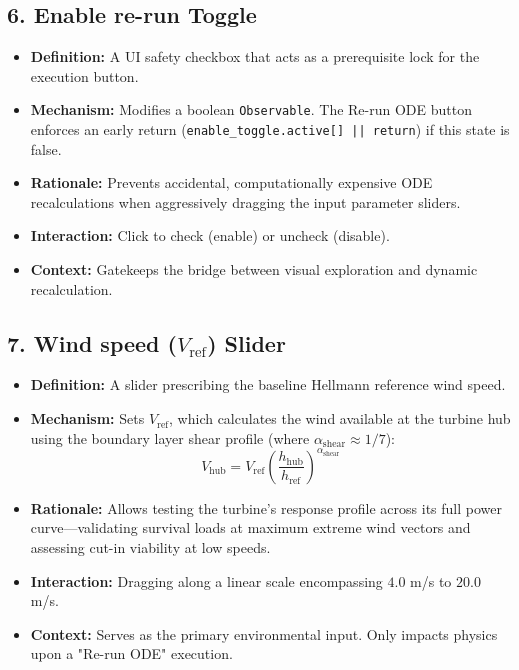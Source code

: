\documentclass[11pt,a4paper]{article}
\begin{document}
\subsection{6. Enable re-run Toggle}
\begin{itemize}
    \item \textbf{Definition:} A UI safety checkbox that acts as a prerequisite lock for the execution button.
    \item \textbf{Mechanism:} Modifies a boolean \texttt{Observable}. The Re-run ODE button enforces an early return (\texttt{enable\_toggle.active[] || return}) if this state is false.
    \item \textbf{Rationale:} Prevents accidental, computationally expensive ODE recalculations when aggressively dragging the input parameter sliders.
    \item \textbf{Interaction:} Click to check (enable) or uncheck (disable).
    \item \textbf{Context:} Gatekeeps the bridge between visual exploration and dynamic recalculation.
\end{itemize}

\subsection{7. Wind speed ($V_{\text{ref}}$) Slider}
\begin{itemize}
    \item \textbf{Definition:} A slider prescribing the baseline Hellmann reference wind speed.
    \item \textbf{Mechanism:} Sets $V_{\text{ref}}$, which calculates the wind available at the turbine hub using the boundary layer shear profile (where $\alpha_{\text{shear}} \approx 1/7$):
    \begin{equation}
        V_{\text{hub}} = V_{\text{ref}} \left( \frac{h_{\text{hub}}}{h_{\text{ref}}} \right)^{\alpha_{\text{shear}}}
    \end{equation}
    \item \textbf{Rationale:} Allows testing the turbine's response profile across its full power curve—validating survival loads at maximum extreme wind vectors and assessing cut-in viability at low speeds.
    \item \textbf{Interaction:} Dragging along a linear scale encompassing $4.0$ m/s to $20.0$ m/s.
    \item \textbf{Context:} Serves as the primary environmental input. Only impacts physics upon a "Re-run ODE" execution.
\end{itemize}
\end{document}
